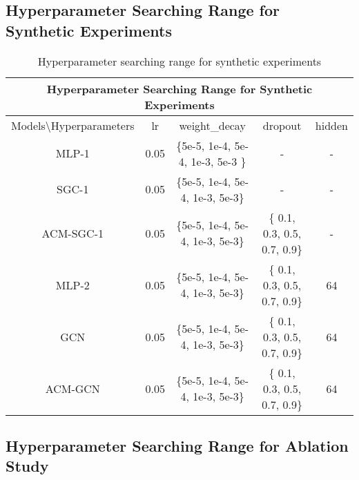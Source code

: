 \documentclass{article}
\newcommand{\0}{{\boldsymbol{0}}}
\newcommand{\6}{{\partial}}
\newcommand{\8}{{\infty}}
\newcommand{\4}{{\nabla}}
\begin{document}
\subsection{Hyperparameter Searching Range for Synthetic Experiments}
\label{appendix:hyperparameter_space_synthetic_graphs}

\begin{table}[htbp]
  \centering
  \caption{Hyperparameter searching range for synthetic experiments}
    \begin{tabular}{c|cccc}
    \toprule
    \toprule
    \multicolumn{5}{c}{Hyperparameter Searching Range for Synthetic Experiments} \\
    \midrule
    Models\textbackslash{}Hyperparameters & lr    & weight\_decay & dropout & hidden \\
    \midrule
    MLP-1 & 0.05  & \{5e-5, 1e-4, 5e-4, 1e-3, 5e-3 \} & -     & - \\
    SGC-1 & 0.05  & \{5e-5, 1e-4, 5e-4, 1e-3, 5e-3\} & -     & - \\
    ACM-SGC-1 & 0.05  & \{5e-5, 1e-4, 5e-4, 1e-3, 5e-3\} &  \{ 0.1, 0.3, 0.5, 0.7, 0.9\} 
    & - \\
    \midrule
    MLP-2 & 0.05  & \{5e-5, 1e-4, 5e-4, 1e-3, 5e-3\} & \{ 0.1, 0.3, 0.5, 0.7, 0.9\} & 64 \\
    GCN   & 0.05  & \{5e-5, 1e-4, 5e-4, 1e-3, 5e-3\} & \{ 0.1, 0.3, 0.5, 0.7, 0.9\} & 64 \\
    ACM-GCN & 0.05  & \{5e-5, 1e-4, 5e-4, 1e-3, 5e-3\} & \{ 0.1, 0.3, 0.5, 0.7, 0.9\} & 64 \\
    \bottomrule
    \bottomrule
    \end{tabular}\label{tab:synthetic_data_hyperparameter_searching_range}\end{table} 
\subsection{Hyperparameter Searching Range for Ablation Study}
\end{document}
